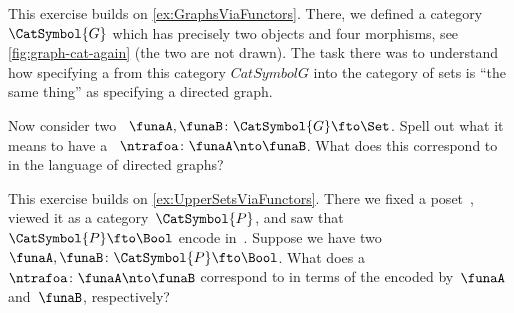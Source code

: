 \begin{gradedexercise}
    \label{ex:NatTrafosGraphs}
    This exercise builds on \cref{ex:GraphsViaFunctors}.
    There, we defined a category~$\CatSymbol{G}$ which has precisely two objects and four morphisms, see \cref{fig:graph-cat-again} (the two  are not drawn).
    The task there was to understand how specifying a  from this category $CatSymbol{G}$ into the category of sets is ``the same thing'' as specifying a directed graph.

    Now consider two ~$\funaA, \funaB \colon \CatSymbol{G} \fto \Set$.
    Spell out what it means to have a ~$\ntrafoa\colon \funaA \nto \funaB$.
    What does this correspond to in the language of directed graphs?
\end{gradedexercise}


\begin{gradedexercise}
    \label{ex:UpperSetsNatTrafos}
    This exercise builds on \cref{ex:UpperSetsViaFunctors}.
    There we fixed a poset~\posA, viewed it as a category~$\CatSymbol{P}$, and saw that ~$\CatSymbol{P} \fto \Bool$ encode  in~\posA.
    Suppose we have two ~$\funaA, \funaB \colon \CatSymbol{P} \fto \Bool$.
    What does a ~$\ntrafoa \colon \funaA \nto \funaB$ correspond to in terms of the  encoded by~$\funaA$ and~$\funaB$, respectively?
\end{gradedexercise}




